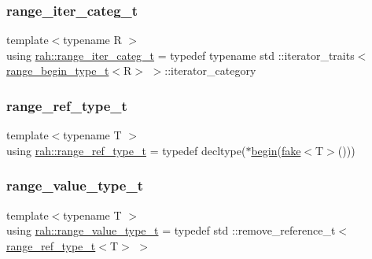 \mbox{\label{namespacerah_a7cdcceefd4c7ad3abffb96560d24517d}} 
\subsubsection{\texorpdfstring{range\_iter\_categ\_t}{range\_iter\_categ\_t}}
{\footnotesize\ttfamily template$<$typename R $>$ \\
using \mbox{\hyperlink{namespacerah_a7cdcceefd4c7ad3abffb96560d24517d}{rah\+::range\+\_\+iter\+\_\+categ\+\_\+t}} = typedef typename std \+::iterator\+\_\+traits$<$\mbox{\hyperlink{namespacerah_a28aff4eeddcece6be65ff0b956d32d4a}{range\+\_\+begin\+\_\+type\+\_\+t}}$<$R$>$ $>$\+::iterator\+\_\+category}

\mbox{\label{namespacerah_a6622426bea22e9509614fe4c574ebeca}} 
\subsubsection{\texorpdfstring{range\_ref\_type\_t}{range\_ref\_type\_t}}
{\footnotesize\ttfamily template$<$typename T $>$ \\
using \mbox{\hyperlink{namespacerah_a6622426bea22e9509614fe4c574ebeca}{rah\+::range\+\_\+ref\+\_\+type\+\_\+t}} = typedef decltype($\ast$\mbox{\hyperlink{namespacerah_acccec48f25fb1a805854818f05d7b616}{begin}}(\mbox{\hyperlink{namespacerah_aa659f5ae02cb923cd8813f96cfd86a25}{fake}}$<$T$>$()))}

\mbox{\label{namespacerah_a0c0c45ea6e732dc2668edfd0e4f8fccf}} 
\subsubsection{\texorpdfstring{range\_value\_type\_t}{range\_value\_type\_t}}
{\footnotesize\ttfamily template$<$typename T $>$ \\
using \mbox{\hyperlink{namespacerah_a0c0c45ea6e732dc2668edfd0e4f8fccf}{rah\+::range\+\_\+value\+\_\+type\+\_\+t}} = typedef std \+::remove\+\_\+reference\+\_\+t$<$\mbox{\hyperlink{namespacerah_a6622426bea22e9509614fe4c574ebeca}{range\+\_\+ref\+\_\+type\+\_\+t}}$<$T$>$ $>$}



